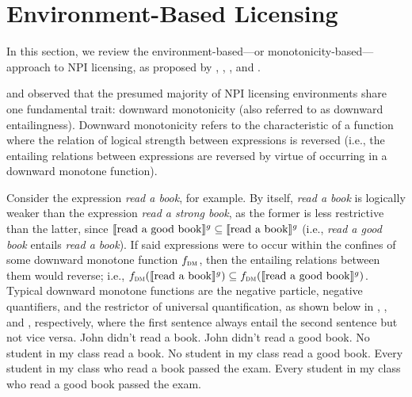 \section{Environment-Based Licensing}
In this section, we review the environment-based---or monotonicity-based---approach to NPI licensing, as proposed by \textcite{Fauconnier1975a,Fauconnier1975b}, \textcite{Ladusaw1980}, \textcite{Giannakidou1998}, and \textcite{Fintel1999,Fintel2001}.

\textcite{Fauconnier1975a,Fauconnier1975b} and \textcite{Ladusaw1980} observed that the presumed majority of NPI licensing environments share one fundamental trait: downward monotonicity (also referred to as downward entailingness). Downward monotonicity refers to the characteristic of a function where the relation of logical strength between expressions is reversed (i.e., the entailing relations between expressions are reversed by virtue of occurring in a downward monotone function).
\ex{}\label{def:dm}%

\xe
Consider the expression \textit{read a book}, for example. By itself, \textit{read a book} is logically weaker than the expression \textit{read a strong book}, as the former is less restrictive than the latter, since $\llbracket\text{read a good book}\rrbracket^{g}\subseteq\llbracket\text{read a book}\rrbracket^{g}$ (i.e., \textit{read a good book} entails \textit{read a book}). If said expressions were to occur within the confines of some downward monotone function $f_\text{\scshape dm}$, then the entailing relations between them would reverse; i.e., $f_\text{\scshape dm}(\llbracket\text{read a book}\rrbracket^{g})\subseteq f_\text{\scshape dm}(\llbracket\text{read a good book}\rrbracket^{g})$. Typical downward monotone functions are the negative particle, negative quantifiers, and the restrictor of universal quantification, as shown below in , , and , respectively, where the first sentence always entail the second sentence but not vice versa.
\pex[nopreamble=true]\label{ex:dm-neg}%
\a{} John didn't read a book.
\a{} John didn't read a good book.
\xe
\pex[nopreamble=true]\label{ex:dm-negquant}%
\a{} No student in my class read a book.
\a{} No student in my class read a good book.
\xe
\pex[nopreamble=true]\label{ex:dm-every}%
\a{} Every student in my class who read a book passed the exam.
\a{} Every student in my class who read a good book passed the exam.

